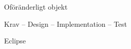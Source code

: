 \documentclass{lecturenotes}
\begin{document}
\begin{Slide}{Oföränderligt objekt}

\end{Slide}

\begin{Slide}{Krav -- Design -- Implementation -- Test}
\end{Slide}

\begin{Slide}{Eclipse}
\end{Slide}
\end{document}
